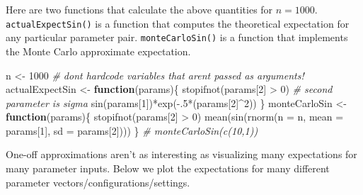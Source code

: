 \documentclass[
  12pt,
  krantz2]{krantz}
\makeatletter
\newenvironment{Shaded}{\begin{snugshade}}{\end{snugshade}}
\newcommand{\AttributeTok}[1]{\textcolor[rgb]{0.61,0.61,0.61}{#1}}
\newcommand{\CommentTok}[1]{\textcolor[rgb]{0.37,0.37,0.37}{\textit{#1}}}
\newcommand{\ControlFlowTok}[1]{\textcolor[rgb]{0.27,0.27,0.27}{\textbf{#1}}}
\newcommand{\DecValTok}[1]{\textcolor[rgb]{0.06,0.06,0.06}{#1}}
\newcommand{\FunctionTok}[1]{\textcolor[rgb]{0,0,0}{#1}}
\newcommand{\NormalTok}[1]{#1}
\newcommand{\OtherTok}[1]{\textcolor[rgb]{0.37,0.37,0.37}{#1}}
\newcommand{\SpecialCharTok}[1]{\textcolor[rgb]{0,0,0}{#1}}
\newenvironment{kframe}{%
\medskip{}
\setlength{\fboxsep}{.8em}
 \def\at@end@of@kframe{}%
 \ifinner\ifhmode%
  \def\at@end@of@kframe{\end{minipage}}%
  \begin{minipage}{\columnwidth}%
 \fi\fi%
 \def\FrameCommand##1{\hskip\@totalleftmargin \hskip-\fboxsep
 \colorbox{shadecolor}{##1}\hskip-\fboxsep
     \hskip-\linewidth \hskip-\@totalleftmargin \hskip\columnwidth}%
 \MakeFramed {\advance\hsize-\width
   \@totalleftmargin\z@ \linewidth\hsize
   \@setminipage}}%
 {\par\unskip\endMakeFramed%
 \at@end@of@kframe}
\renewenvironment{Shaded}{\begin{kframe}}{\end{kframe}}
\makeatother
\begin{document}
Here are two functions that calculate the above quantities for \(n=1000\). \texttt{actualExpectSin()} is a function that computes the theoretical expectation for any particular parameter pair. \texttt{monteCarloSin()} is a function that implements the Monte Carlo approximate expectation.

\begin{Shaded}
\begin{Highlighting}[]
\NormalTok{n }\OtherTok{\textless{}{-}} \DecValTok{1000} \CommentTok{\# don\textquotesingle{}t hardcode variables that aren\textquotesingle{}t passed as arguments!}
\NormalTok{actualExpectSin }\OtherTok{\textless{}{-}} \ControlFlowTok{function}\NormalTok{(params)\{}
  \FunctionTok{stopifnot}\NormalTok{(params[}\DecValTok{2}\NormalTok{] }\SpecialCharTok{\textgreater{}} \DecValTok{0}\NormalTok{) }\CommentTok{\# second parameter is sigma}
  \FunctionTok{sin}\NormalTok{(params[}\DecValTok{1}\NormalTok{])}\SpecialCharTok{*}\FunctionTok{exp}\NormalTok{(}\SpecialCharTok{{-}}\NormalTok{.}\DecValTok{5}\SpecialCharTok{*}\NormalTok{(params[}\DecValTok{2}\NormalTok{]}\SpecialCharTok{\^{}}\DecValTok{2}\NormalTok{))}
\NormalTok{\}}
\NormalTok{monteCarloSin }\OtherTok{\textless{}{-}} \ControlFlowTok{function}\NormalTok{(params)\{}
  \FunctionTok{stopifnot}\NormalTok{(params[}\DecValTok{2}\NormalTok{] }\SpecialCharTok{\textgreater{}} \DecValTok{0}\NormalTok{) }
  \FunctionTok{mean}\NormalTok{(}\FunctionTok{sin}\NormalTok{(}\FunctionTok{rnorm}\NormalTok{(}\AttributeTok{n =}\NormalTok{ n, }\AttributeTok{mean =}\NormalTok{ params[}\DecValTok{1}\NormalTok{], }\AttributeTok{sd =}\NormalTok{ params[}\DecValTok{2}\NormalTok{])))}
\NormalTok{\}}
\CommentTok{\# monteCarloSin(c(10,1))}
\end{Highlighting}
\end{Shaded}

One-off approximations aren't as interesting as visualizing many expectations for many parameter inputs. Below we plot the expectations for many different parameter vectors/configurations/settings.
\end{document}
